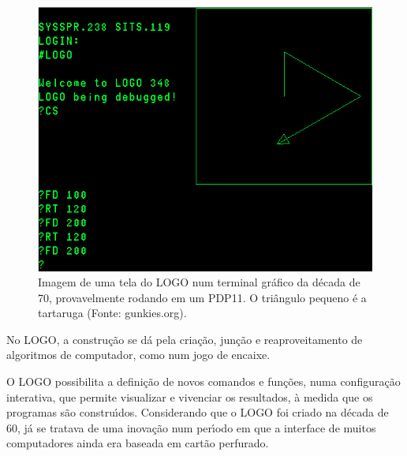 \documentclass[
12pt,		%
openright,	%
twoside,  %
a4paper,			%
chapter=TITLE,		%
english,			%
french,				%
spanish,			%
brazil				%
]{USPSC-classe/USPSC}
\begin{document}
\begin{figure}[max size={\textwidth}{\textheight}]
\begin{minipage}[b]{0.4\linewidth}
                \includegraphics[width=1.0\linewidth]{../../imagens/logo-PDP11.png}
                \caption{Imagem de uma tela do LOGO num terminal gr\'afico da d\'ecada de 70, provavelmente rodando em um PDP11. O tri\^angulo pequeno \'e a tartaruga (Fonte: gunkies.org).}
                \label{ca83b217b58f57e503ff496c6c6f47bee5dc77cd}
\end{minipage}
\hspace{0.5cm}
\end{figure}



No LOGO, a constru\c{c}\~ao se d\'a pela cria\c{c}\~ao, jun\c{c}\~ao e reaproveitamento de algoritmos de computador, como num jogo de encaixe.

















O LOGO possibilita a defini\c{c}\~ao de novos comandos e fun\c{c}\~oes, numa configura\c{c}\~ao interativa, que permite visualizar e vivenciar os resultados, \`a medida que os programas s\~ao constru\'{\i}dos. Considerando que o LOGO foi criado na d\'ecada de 60, j\'a se tratava de uma inova\c{c}\~ao num per\'{\i}odo em que a interface de muitos computadores ainda era baseada em cart\~ao perfurado.
\end{document}
